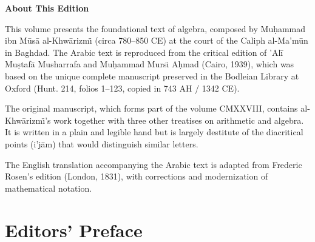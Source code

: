 \documentclass[11pt,a4paper,openany,oneside]{book}
\begin{document}
\thispagestyle{empty}
\begin{center}
\vspace*{3cm}

{\Large\textbf{About This Edition}}

\vspace{1cm}

\begin{minipage}{0.8\textwidth}
\small
This volume presents the foundational text of algebra, composed by
Mu\d{h}ammad ibn M\=us\=a al-Khw\=arizm\"{\i} (circa 780--850 CE) at the court
of the Caliph al-Ma'm\=un in Baghdad. The Arabic text is reproduced
from the critical edition of 'Al\=i Mu\d{s}taf\=a Musharrafa and
Mu\d{h}ammad Murs\"{\i} A\d{h}mad (Cairo, 1939), which was based on the
unique complete manuscript preserved in the Bodleian Library at Oxford
(Hunt. 214, folios 1--123, copied in 743 AH / 1342 CE).

\vspace{0.5cm}

The original manuscript, which forms part of the volume CMXXVIII,
contains al-Khw\=arizm\"{\i}'s work together with three other treatises
on arithmetic and algebra. It is written in a plain and legible hand
but is largely destitute of the diacritical points (i'j\=am) that
would distinguish similar letters.

\vspace{0.5cm}

The English translation accompanying the Arabic text is adapted from
Frederic Rosen's edition (London, 1831), with corrections and
modernization of mathematical notation.
\end{minipage}
\end{center}

\newpage

\tableofcontents
\newpage

\chapter*{Editors' Preface}
\end{document}
